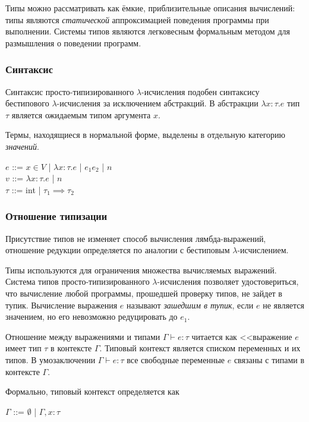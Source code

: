 Типы можно рассматривать как ёмкие, приблизительные описания вычислений: типы являются \emph{статической} аппроксимацией поведения программы при выполнении. Системы типов являются легковесным формальным методом для размышления о поведении программ.

\subsubsection{Синтаксис}

Синтаксис просто-типизированного $\lambda$-исчисления подобен синтаксису бестипового $\lambda$-исчисления за исключением абстракций. В абстракции $\lambda x: \tau . e$ тип $\tau$ является ожидаемым типом аргумента $x$.

Термы, находящиеся в нормальной форме, выделены в отдельную категорию \emph{значений}.

\begin{center}
$e$ ::= $x \in V$ | $\lambda x : \tau. e$ | $e_1 e_2$ | $n$ \\
$v$ ::= $\lambda x : \tau. e$ | $n$ \\
$\tau$ ::= int | $\tau_1 \implies \tau_2$
\end{center}

\subsubsection{Отношение типизации}

Присутствие типов не изменяет способ вычисления лямбда-выражений, отношение редукции определяется по аналогии с бестиповым $\lambda$-исчислением.

Типы используются для ограничения множества вычисляемых выражений. Система типов просто-типизированного $\lambda$-исчисления позволяет удостовериться, что вычисление любой программы, прошедшей проверку типов, не зайдет в тупик. Вычисление выражения $e$ называют \emph{зашедшим в тупик}, если $e$ не является значением, но его невозможно редуцировать до $e_1$.

Отношение между выражениями и типами $\Gamma \vdash e:\tau$ читается как <<выражение $e$ имеет тип $\tau$ в контексте $\Gamma$. Типовый контекст является списком переменных и их типов. В умозаключении $\Gamma \vdash e:\tau$ все свободные переменные $e$ связаны с типами в контексте $\Gamma$.

Формально, типовый контекст определяется как
\begin{center}
$\Gamma$ ::= $\emptyset$ | $\Gamma, x:\tau$
\end{center}

